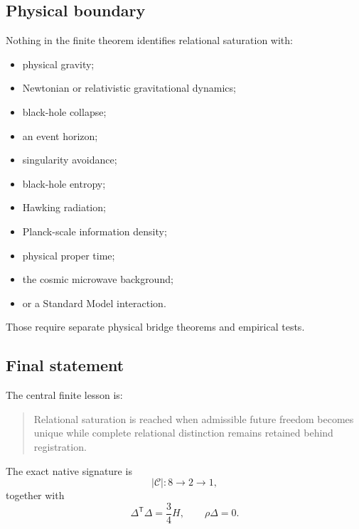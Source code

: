 \subsection{Physical boundary}

Nothing in the finite theorem identifies relational saturation with:

\begin{itemize}

\item physical gravity;

\item Newtonian or relativistic gravitational dynamics;

\item black-hole collapse;

\item an event horizon;

\item singularity avoidance;

\item black-hole entropy;

\item Hawking radiation;

\item Planck-scale information density;

\item physical proper time;

\item the cosmic microwave background;

\item or a Standard Model interaction.

\end{itemize}

Those require separate physical bridge theorems and empirical tests.

\subsection{Final statement}

The central finite lesson is:

\begin{quote}
Relational saturation is reached when admissible future freedom
becomes unique while complete relational distinction remains retained
behind registration.
\end{quote}

The exact native signature is
\[
|\mathcal C|:
8\longrightarrow2\longrightarrow1,
\]
together with
\[
\Delta^{\mathsf T}\Delta=\frac34H,
\qquad
\rho\Delta=0.
\]

